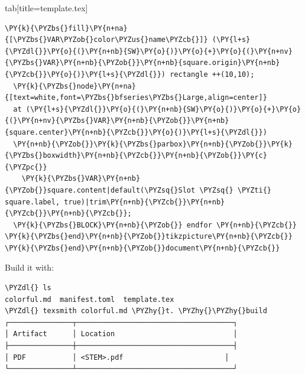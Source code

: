 \documentclass[a4paper,twoside]{article}
\begin{document}
\begin{tsdiv}{tab}[title=template.tex]
\begin{tscode}[lang=tex, engine=pygments]
\begin{Verbatim}[commandchars=\\\{\},breaklines, breakanywhere, commandchars=\\\{\}]
  \PY{k}{\PYZbs{}fill}\PY{n+na}{[\PYZbs{}VAR\PYZob{}color\PYZus{}name\PYZcb{}]} (\PY{l+s}{\PYZdl{}}\PY{o}{(}\PY{n+nb}{SW}\PY{o}{)}\PY{o}{+}\PY{o}{(}\PY{n+nv}{\PYZbs{}VAR}\PY{n+nb}{\PYZob{}}\PY{n+nb}{square.origin}\PY{n+nb}{\PYZcb{}}\PY{o}{)}\PY{l+s}{\PYZdl{}}) rectangle ++(10,10);
  \PY{k}{\PYZbs{}node}\PY{n+na}{[text=white,font=\PYZbs{}bfseries\PYZbs{}Large,align=center]}
  at (\PY{l+s}{\PYZdl{}}\PY{o}{(}\PY{n+nb}{SW}\PY{o}{)}\PY{o}{+}\PY{o}{(}\PY{n+nv}{\PYZbs{}VAR}\PY{n+nb}{\PYZob{}}\PY{n+nb}{square.center}\PY{n+nb}{\PYZcb{}}\PY{o}{)}\PY{l+s}{\PYZdl{}})
  \PY{n+nb}{\PYZob{}}\PY{k}{\PYZbs{}parbox}\PY{n+nb}{\PYZob{}}\PY{k}{\PYZbs{}boxwidth}\PY{n+nb}{\PYZcb{}}\PY{n+nb}{\PYZob{}}\PY{c}{\PYZpc{}}
    \PY{k}{\PYZbs{}VAR}\PY{n+nb}{\PYZob{}}square.content|default(\PYZsq{}Slot \PYZsq{} \PYZti{} square.label, true)|trim\PY{n+nb}{\PYZcb{}}\PY{n+nb}{\PYZcb{}}\PY{n+nb}{\PYZcb{}};
  \PY{k}{\PYZbs{}BLOCK}\PY{n+nb}{\PYZob{}} endfor \PY{n+nb}{\PYZcb{}}
\PY{k}{\PYZbs{}end}\PY{n+nb}{\PYZob{}}tikzpicture\PY{n+nb}{\PYZcb{}}
\PY{k}{\PYZbs{}end}\PY{n+nb}{\PYZob{}}document\PY{n+nb}{\PYZcb{}}
\end{Verbatim}
\end{tscode}
\end{tsdiv}
Build it with:
\begin{tscode}[lang=text, stretch=0.5, engine=pygments]
\begin{Verbatim}[commandchars=\\\{\},breaklines, breakanywhere, commandchars=\\\{\}]
\PYZdl{} ls
colorful.md  manifest.toml  template.tex
\PYZdl{} texsmith colorful.md \PYZhy{}t. \PYZhy{}\PYZhy{}build
┌───────────────┬─────────────────────────────────────┐
│ Artifact      │ Location                            │
├───────────────┼─────────────────────────────────────┤
│ PDF           │ <STEM>.pdf                        │
└───────────────┴─────────────────────────────────────┘
\end{Verbatim}
\end{tscode}
\end{document}
